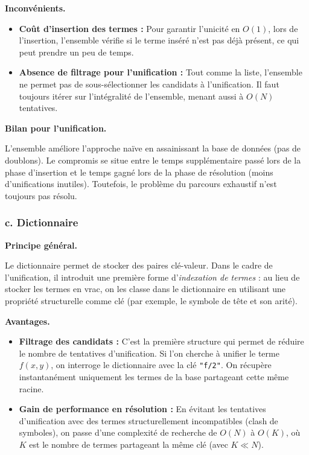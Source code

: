 \documentclass[11pt]{article}
\begin{document}
\vspace{0.4cm}
\noindent\textbf{Inconvénients.}

\begin{itemize}
    \item \textbf{Coût d'insertion des termes :} Pour garantir l'unicité en $O(1)$, lors de l'insertion, l'ensemble vérifie si le terme inséré n'est pas déjà présent, ce qui peut prendre un peu de temps.
    \item \textbf{Absence de filtrage pour l'unification :} Tout comme la liste, l'ensemble ne permet pas de sous-sélectionner les candidats à l'unification. Il faut toujours itérer sur l'intégralité de l'ensemble, menant aussi à $O(N)$ tentatives.
\end{itemize}

\vspace{0.4cm}
\noindent\textbf{Bilan pour l'unification.}

\vspace{0.2cm}
L'ensemble améliore l'approche naïve en assainissant la base de données (pas de doublons). Le compromis se situe entre le temps supplémentaire passé lors de la phase d'insertion et le temps gagné lors de la phase de résolution (moins d'unifications inutiles). Toutefois, le problème du parcours exhaustif n'est toujours pas résolu.

\newpage

\subsubsection*{\hspace{4em}c. Dictionnaire}
\label{dictionnaire}

\vspace{0.4cm}

\noindent\textbf{Principe général.}

\vspace{0.2cm}
Le dictionnaire permet de stocker des paires clé-valeur. Dans le cadre de l'unification, il introduit une première forme d'\textit{indexation de termes} : au lieu de stocker les termes en vrac, on les classe dans le dictionnaire en utilisant une propriété structurelle comme clé (par exemple, le symbole de tête et son arité).

\vspace{0.4cm}
\noindent\textbf{Avantages.}

\begin{itemize}
    \item \textbf{Filtrage des candidats :} C'est la première structure qui permet de réduire le nombre de tentatives d'unification. Si l'on cherche à unifier le terme $f(x, y)$, on interroge le dictionnaire avec la clé \texttt{"f/2"}. On récupère instantanément uniquement les termes de la base partageant cette même racine. 
    \item \textbf{Gain de performance en résolution :} En évitant les tentatives d'unification avec des termes structurellement incompatibles (clash de symboles), on passe d'une complexité de recherche de $O(N)$ à $O(K)$, où $K$ est le nombre de termes partageant la même clé (avec $K \ll N$).
\end{itemize}
\end{document}
